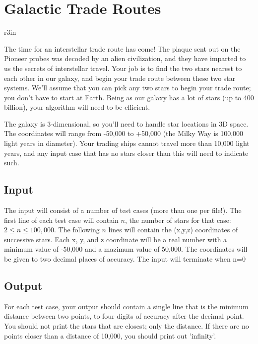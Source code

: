 \documentclass[11pt]{article}
\begin{document}
\section*{Galactic Trade Routes}


\begin{wrapfigure}{r}{3in}
\vspace{-10pt}
\vspace{-30pt}
\end{wrapfigure}

The time for an interstellar trade route has come! The plaque sent out on the Pioneer probes was decoded by an alien civilization, and they have imparted to us the secrets of interstellar travel. Your job is to find the two stars nearest to each other in our galaxy, and begin your trade route between these two star systems. We’ll assume that you can pick any two stars to begin your trade route; you don’t have to start at Earth. Being as our galaxy has a lot of stars (up to 400 billion), your algorithm will need to be efficient.

The galaxy is 3-dimensional, so you'll need to handle star locations in 3D space. The coordinates will range from -50,000 to +50,000 (the Milky Way is 100,000 light years in diameter). Your trading ships cannot travel more than 10,000 light years, and any input case that has no stars closer than this will need to indicate such.


\subsection*{Input}
The input will consist of a number of test cases (more than one per file!). The first line of each test case will contain $n$, the number of stars for that case: $2 \leq n \leq 100,000$. The following $n$ lines will contain the (x,y,z) coordinates of successive stars. Each x, y, and z coordinate will be a real number with a minimum value of -50,000 and a mazimum value of 50,000. The coordinates will be given to two decimal places of accuracy. The input will terminate when n=0

\subsection*{Output}
For each test case, your output should contain a single line that is the minimum distance between two points, to four digits of accuracy after the decimal point. You should not print the stars that are closest; only the distance. If there are no points closer than a distance of 10,000, you should print out ’infinity’.
\end{document}
